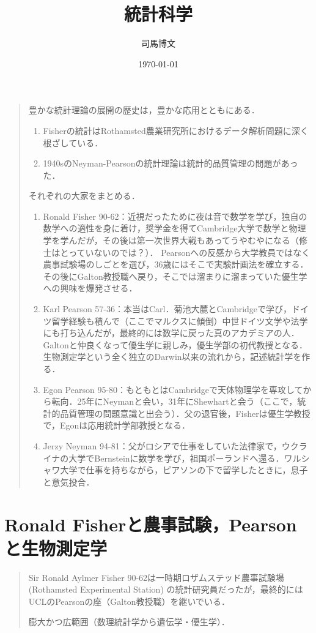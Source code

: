 \documentclass[uplatex,dvipdfmx]{jsreport}
\title{統計科学}
\author{司馬博文}
\date{\today}
\begin{document}
\tableofcontents

\begin{quotation}
    豊かな統計理論の展開の歴史は，豊かな応用とともにある．
    \begin{enumerate}
        \item Fisherの統計はRothamsted農業研究所におけるデータ解析問題に深く根ざしている．
        \item 1940sのNeyman-Pearsonの統計理論は統計的品質管理の問題があった．
    \end{enumerate}
    それぞれの大家をまとめる．
    \begin{enumerate}
        \item Ronald Fisher 90-62：近視だったために夜は音で数学を学び，独自の数学への適性を身に着け，奨学金を得てCambridge大学で数学と物理学を学んだが，その後は第一次世界大戦もあってうやむやになる（修士はとっていないのでは？）．
        Pearsonへの反感から大学教員ではなく農事試験場のしごとを選び，36歳にはそこで実験計画法を確立する．その後にGalton教授職へ戻り，そこでは溜まりに溜まっていた優生学への興味を爆発させる．
        \item Karl Pearson 57-36：本当はCarl．菊池大麓とCambridgeで学び，ドイツ留学経験も積んで（ここでマルクスに傾倒）中世ドイツ文学や法学にも打ち込んだが，最終的には数学に戻った真のアカデミアの人．Galtonと仲良くなって優生学に親しみ，優生学部の初代教授となる．生物測定学という全く独立のDarwin以来の流れから，記述統計学を作る．
        \item Egon Pearson 95-80：もともとはCambridgeで天体物理学を専攻してから転向．25年にNeymanと会い，31年にShewhartと会う（ここで，統計的品質管理の問題意識と出会う）．父の退官後，Fisherは優生学教授で，Egonは応用統計学部教授となる．
        \item Jerzy Neyman 94-81：父がロシアで仕事をしていた法律家で，ウクライナの大学でBernsteinに数学を学び，祖国ポーランドへ還る．ワルシャワ大学で仕事を持ちながら，ピアソンの下で留学したときに，息子と意気投合．
    \end{enumerate}
\end{quotation}

\chapter{Ronald Fisherと農事試験，Pearsonと生物測定学}

\begin{quotation}
    Sir Ronald Aylmer Fisher 90-62は一時期ロザムステッド農事試験場 (Rothamsted Experimental Station) の統計研究員だったが，最終的にはUCLのPearsonの座（Galton教授職）を継いでいる．

    膨大かつ広範囲（数理統計学から遺伝学・優生学）．
    
    
\end{quotation}
\end{document}
